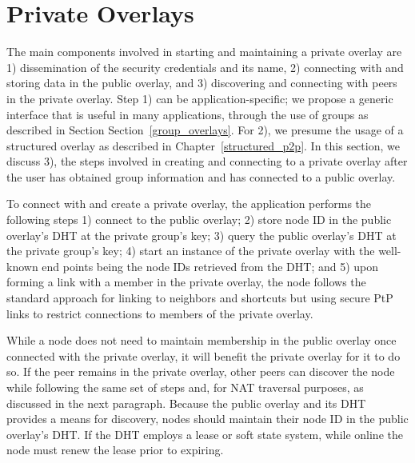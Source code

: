 \section{Private Overlays}
\label{private_overlays}
The main components involved in starting and maintaining a private overlay
are 1) dissemination of the security credentials and its name, 2) connecting
with and storing data in the public overlay, and 3) discovering and connecting
with peers in the private overlay.  Step 1) can be application-specific; we
propose a generic interface that is useful in many applications, through the
use of groups as described in Section Section~\ref{group_overlays}.  For 2),
we presume the usage of a structured overlay as described in
Chapter~\ref{structured_p2p}.  In this section, we discuss 3), the steps
involved in creating and connecting to a private overlay after the user has
obtained group information and has connected to a public overlay.

To connect with and create a private overlay, the application performs the
following steps%
1) connect to the public overlay; 2) store node ID in the public overlay's DHT
at the private group's key; 3) query the public overlay's DHT at the private
group's key; 4) start an instance of the private overlay with the well-known
end points being the node IDs retrieved from the DHT; and 5) upon forming a
link with a member in the private overlay, the node follows the standard
approach for linking to neighbors and shortcuts but using secure PtP links to
restrict connections to members of the private overlay.

While a node does not need to maintain membership in the public overlay once
connected with the private overlay, it will benefit the private overlay for it
to do so.  If the peer remains in the private overlay, other peers can discover
the node while following the same set of steps and, for NAT traversal purposes,
as discussed in the next paragraph.  Because the public overlay and its DHT
provides a means for discovery, nodes should maintain their node ID in the public
overlay's DHT.  If the DHT employs a lease or soft state system, while online
the node must renew the lease prior to expiring.

